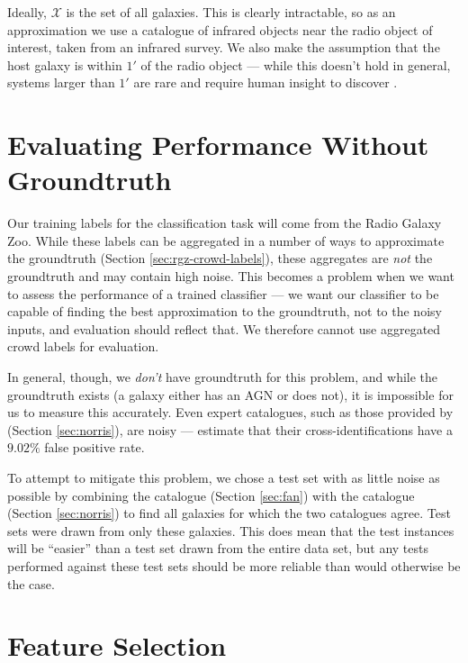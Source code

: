   Ideally, $\mathcal X$ is the set of all galaxies. This is clearly
  intractable, so as an approximation we use a catalogue of infrared objects
  near the radio object of interest, taken from an infrared survey. We also
  make the assumption that the host galaxy is within $1'$ of the radio object
  --- while this doesn't hold in general, systems larger than $1'$ are rare and
  require human insight to discover \citep{banfield16}.

\section{Evaluating Performance Without Groundtruth}
\label{sec:norris-as-groundtruth}
  
  Our training labels for the classification task will come from the Radio
  Galaxy Zoo. While these labels can be aggregated in a number of ways to
  approximate the groundtruth (Section \ref{sec:rgz-crowd-labels}), these
  aggregates are \emph{not} the groundtruth and may contain high noise. This
  becomes a problem when we want to assess the performance of a trained
  classifier --- we want our classifier to be capable of finding the best
  approximation to the groundtruth, not to the noisy inputs, and evaluation
  should reflect that. We therefore cannot use aggregated crowd labels for
  evaluation.

  In general, though, we \emph{don't} have groundtruth for this problem, and
  while the groundtruth exists (a galaxy either has an AGN or does not), it is
  impossible for us to measure this accurately. Even expert catalogues, such as
  those provided by \citeauthor{norris06} (Section \ref{sec:norris}), are noisy
  --- \citep{norris06} estimate that their cross-identifications have a $9.02\%$
  false positive rate.

  To attempt to mitigate this problem, we chose a test set with as little noise
  as possible by combining the \citeauthor{fan15} catalogue (Section
  \ref{sec:fan}) with the \citeauthor{norris06} catalogue (Section
  \ref{sec:norris}) to find all galaxies for which the two catalogues agree.
  Test sets were drawn from only these galaxies. This does mean that the test
  instances will be ``easier'' than a test set drawn from the entire data set,
  but any tests performed against these test sets should be more reliable than
  would otherwise be the case.

\section{Feature Selection}
\label{sec:features}

